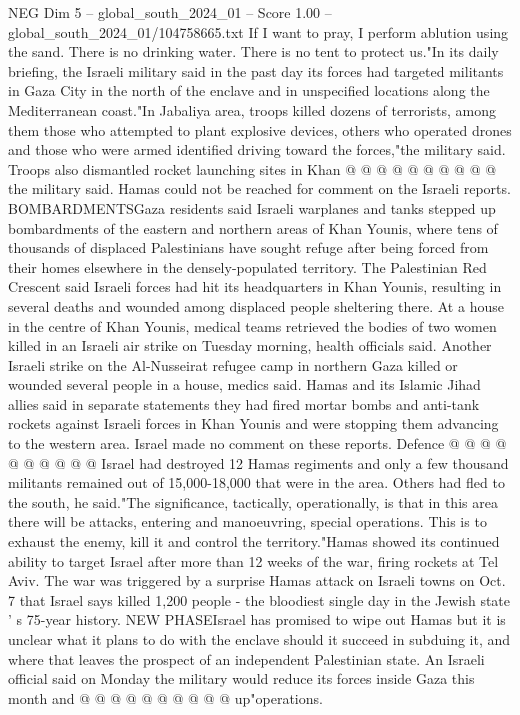 \begin{textsample}{NEG Dim 5 – global\_south\_2024\_01 – Score 1.00 – global\_south\_2024\_01/104758665.txt}
If I want to pray, I perform ablution using the sand.
There is no drinking water.
There is no tent to protect us."In its daily briefing, the Israeli military said in the past day its forces had targeted militants in Gaza City in the north of the enclave and in unspecified locations along the Mediterranean coast."In Jabaliya area, troops killed dozens of terrorists, among them those who attempted to plant explosive devices, others who operated drones and those who were armed identified driving toward the forces,"the military said.
Troops also dismantled rocket launching sites in Khan @ @ @ @ @ @ @ @ @ @ the military said.
Hamas could not be reached for comment on the Israeli reports.
BOMBARDMENTSGaza residents said Israeli warplanes and tanks stepped up bombardments of the eastern and northern areas of Khan Younis, where tens of thousands of displaced Palestinians have sought refuge after being forced from their homes elsewhere in the densely-populated territory.
The Palestinian Red Crescent said Israeli forces had hit its headquarters in Khan Younis, resulting in several deaths and wounded among displaced people sheltering there.
At a house in the centre of Khan Younis, medical teams retrieved the bodies of two women killed in an Israeli air strike on Tuesday morning, health officials said.
Another Israeli strike on the Al-Nusseirat refugee camp in northern Gaza killed or wounded several people in a house, medics said.
Hamas and its Islamic Jihad allies said in separate statements they had fired mortar bombs and anti-tank rockets against Israeli forces in Khan Younis and were stopping them advancing to the western area.
Israel made no comment on these reports.
Defence @ @ @ @ @ @ @ @ @ @ Israel had destroyed 12 Hamas regiments and only a few thousand militants remained out of 15,000-18,000 that were in the area.
Others had fled to the south, he said."The significance, tactically, operationally, is that in this area there will be attacks, entering and manoeuvring, special operations.
This is to exhaust the enemy, kill it and control the territory."Hamas showed its continued ability to target Israel after more than 12 weeks of the war, firing rockets at Tel Aviv.
The war was triggered by a surprise Hamas attack on Israeli towns on Oct. 7 that Israel says killed 1,200 people - the bloodiest single day in the Jewish state ' s 75-year history.
NEW PHASEIsrael has promised to wipe out Hamas but it is unclear what it plans to do with the enclave should it succeed in subduing it, and where that leaves the prospect of an independent Palestinian state.
An Israeli official said on Monday the military would reduce its forces inside Gaza this month and @ @ @ @ @ @ @ @ @ @ up"operations.

\end{textsample}
